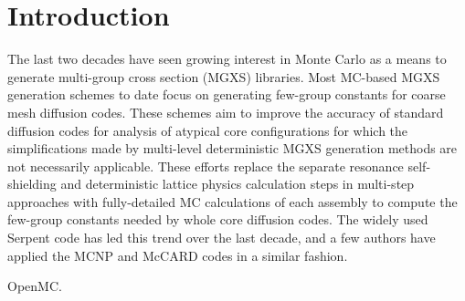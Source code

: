 \section{Introduction}
\label{sec:intro}

The last two decades have seen growing interest in Monte Carlo as a means to generate multi-group cross section (MGXS) libraries. Most MC-based MGXS generation schemes to date focus on generating few-group constants for coarse mesh diffusion codes. These schemes aim to improve the accuracy of standard diffusion codes for analysis of atypical core configurations for which the simplifications made by multi-level deterministic MGXS generation methods are not necessarily applicable. These efforts replace the separate resonance self-shielding and deterministic lattice physics calculation steps in multi-step approaches with fully-detailed MC calculations of each assembly to compute the few-group constants needed by whole core diffusion codes. The widely used Serpent code\cite{leppanen2007serpent} has led this trend over the last decade, and a few authors have applied the MCNP\cite{pounders2006stochastically} and McCARD\cite{shim2008generation} codes in a similar fashion.

OpenMC\cite{romano2015openmc}.
